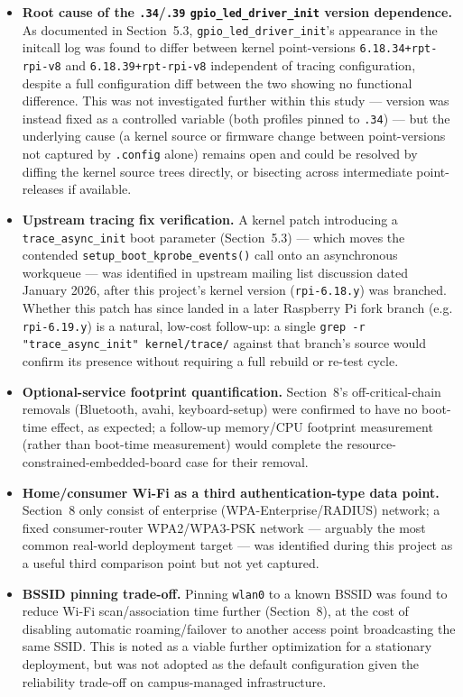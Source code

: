 \documentclass[11pt,a4paper]{article}
\begin{document}
\begin{itemize}
    \item \textbf{Root cause of the \texttt{.34}/\texttt{.39} \texttt{gpio\_led\_driver\_init} version dependence.} As documented in Section~5.3, \texttt{gpio\_led\_driver\_init}'s appearance in the initcall log was found to differ between kernel point-versions \texttt{6.18.34+rpt-rpi-v8} and \texttt{6.18.39+rpt-rpi-v8} independent of tracing configuration, despite a full configuration diff between the two showing no functional difference. This was not investigated further within this study — version was instead fixed as a controlled variable (both profiles pinned to \texttt{.34}) — but the underlying cause (a kernel source or firmware change between point-versions not captured by \texttt{.config} alone) remains open and could be resolved by diffing the kernel source trees directly, or bisecting across intermediate point-releases if available.
    \item \textbf{Upstream tracing fix verification.} A kernel patch introducing a \texttt{trace\_async\_init} boot parameter (Section~5.3) — which moves the contended \texttt{setup\_boot\_kprobe\_events()} call onto an asynchronous workqueue — was identified in upstream mailing list discussion dated January 2026, after this project's kernel version (\texttt{rpi-6.18.y}) was branched. Whether this patch has since landed in a later Raspberry Pi fork branch (e.g. \texttt{rpi-6.19.y}) is a natural, low-cost follow-up: a single \texttt{grep -r "trace\_async\_init" kernel/trace/} against that branch's source would confirm its presence without requiring a full rebuild or re-test cycle.
    \item \textbf{Optional-service footprint quantification.} Section~8's off-critical-chain removals (Bluetooth, avahi, keyboard-setup) were confirmed to have no boot-time effect, as expected; a follow-up memory/CPU footprint measurement (rather than boot-time measurement) would complete the resource-constrained-embedded-board case for their removal.
    \item \textbf{Home/consumer Wi-Fi as a third authentication-type data point.} Section~8 only consist of enterprise (WPA-Enterprise/RADIUS) network; a fixed consumer-router WPA2/WPA3-PSK network — arguably the most common real-world deployment target — was identified during this project as a useful third comparison point but not yet captured.
    \item \textbf{BSSID pinning trade-off.} Pinning \texttt{wlan0} to a known BSSID was found to reduce Wi-Fi scan/association time further (Section~8), at the cost of disabling automatic roaming/failover to another access point broadcasting the same SSID. This is noted as a viable further optimization for a stationary deployment, but was not adopted as the default configuration given the reliability trade-off on campus-managed infrastructure.

\end{itemize}
\end{document}
